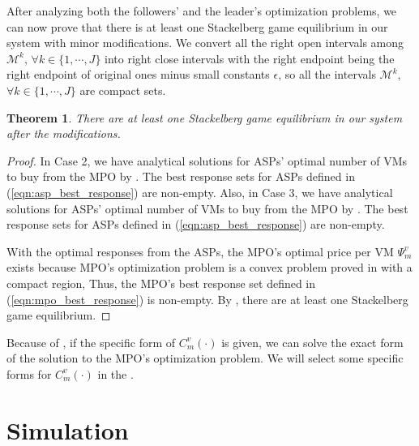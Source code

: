 \documentclass[conference]{IEEEtran}
\newtheorem{theorem}{Theorem}
\begin{document}
After analyzing both the followers' and the leader's optimization problems, we can now prove that there is at least one Stackelberg game equilibrium in our system with minor modifications. We convert all the right open intervals among $\mathcal{M}^k$, $\forall k \in \{1, \cdots, J\}$ into right close intervals with the right endpoint being the right endpoint of original ones minus small constants $\epsilon$, so all the intervals $\mathcal{M}^k$, $\forall k \in \{1, \cdots, J\}$ are compact sets. 
\begin{theorem} \label{thm:stackelberg_game_equilibrium}
There are at least one Stackelberg game equilibrium in our system after the modifications.
\end{theorem}
\begin{proof}

In Case 2, we have analytical solutions for ASPs' optimal number of VMs to buy from the MPO by . The best response sets for ASPs defined in (\ref{eqn:asp_best_response}) are non-empty. Also, in Case 3, we have analytical solutions for ASPs' optimal number of VMs to buy from the MPO by . The best response sets for ASPs defined in (\ref{eqn:asp_best_response}) are non-empty. 

With the optimal responses from the ASPs, the MPO's optimal price per VM $\Psi_m^v$ exists because MPO's optimization problem is a convex problem proved in  with a compact region, Thus, the MPO's best response set defined in (\ref{eqn:mpo_best_response}) is non-empty. By , there are at least one Stackelberg game equilibrium.
\end{proof}
Because of , if the specific form of $C_m^v(\cdot)$ is given, we can solve the exact form of the solution to the MPO's optimization problem. We will select some specific forms for $C_m^v(\cdot)$ in the .



\section{Simulation} \label{sec:simulation}
\end{document}
